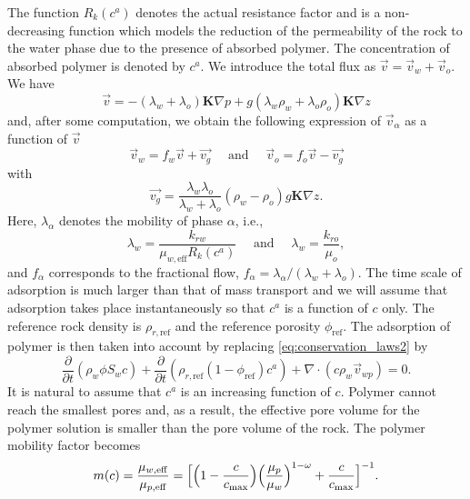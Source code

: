\documentclass[11pt]{amsart}
\newcommand{\cads}{c^a}
\newcommand{\eff}{\mathrm{eff}}
\newcommand{\cmax}{c_{\max}}
\newcommand{\Kb}{{\bm{K}}}
\newcommand{\fracpar}[2]{\frac{\partial #1}{\partial #2}}
\begin{document}
The function $R_k(\cads)$ denotes the actual resistance factor and is a non-decreasing function
which models the reduction of the permeability of the rock to the water phase due to the presence of
absorbed polymer. The concentration of absorbed polymer is denoted by $\cads$. We introduce the
total flux as $\vec{v} = \vec{v}_w + \vec{v}_o$. We have
\begin{equation*}
  \vec{v} = -(\lambda_w + \lambda_o)\Kb\nabla p + g(\lambda_w\rho_w + \lambda_o\rho_o)\Kb\nabla z 
\end{equation*}
and, after some computation, we obtain the following expression of $\vec{v}_\alpha$ as a function of
$\vec{v}$
\begin{equation}
  \label{eq:valphav}
  \vec{v}_w = f_w \vec{v} + \vec{v_g}\quad\text{ and }\quad  \vec{v}_o = f_o \vec{v} - \vec{v_g}
\end{equation}
with
\begin{equation}
  \label{eq:gravterm}
  \vec{v_g} = \frac{\lambda_w\lambda_{o}}{\lambda_w+\lambda_{o}}(\rho_w-\rho_{o})g\Kb\nabla z.
\end{equation}
Here, $\lambda_\alpha$ denotes the mobility of phase $\alpha$, i.e.,
\begin{equation*}
  \lambda_w = \frac{k_{rw}}{\mu_{w,\eff}R_k(\cads)}\quad\text{ and }\quad  \lambda_w = \frac{k_{ro}}{\mu_{o}},
\end{equation*}
and $f_\alpha$ corresponds to the fractional flow, $f_\alpha =\lambda_{\alpha}/(\lambda_{w} +
\lambda_{o})$. The time scale of adsorption is much larger than that of mass transport and we will
assume that adsorption takes place instantaneously so that $\cads$ is a function of $c$ only.  The
reference rock density is $\rho_{r, \text{ref}}$ and the reference porosity $\phi_\text{ref}$.  The
adsorption of polymer is then taken into account by replacing \eqref{eq:conservation_laws2} by
\begin{equation}
  \label{eq:conservation_laws2_withads}
  \frac{\partial}{\partial t} (\rho_{w}\phi S_w c)+
  \fracpar{}{t}\left(\rho_{r, \text{ref}}(1-\phi_\text{ref})\cads\right)+\nabla\cdot(c
  \rho_{w} \vec{v}_{wp})  = 0.
\end{equation}
It is natural to assume that $\cads$ is an increasing function of $c$. Polymer
cannot reach the smallest pores and, as a result, the effective pore volume for
the polymer solution is smaller than the pore volume of the rock. The polymer
mobility factor becomes
\begin{equation}
  \label{eq:defmdps}
  m(c) = \frac{\mu_{w,\eff}}{\mu_{p,\eff}} = \Bigl[\Bigl(1 -\frac{c}{\cmax}\Bigr)
  \Bigl(\frac{\mu_p}{\mu_w}\Bigr)^{1-\omega} + \frac{c}{\cmax}\Bigr]^{-1}.
\end{equation}
\end{document}
